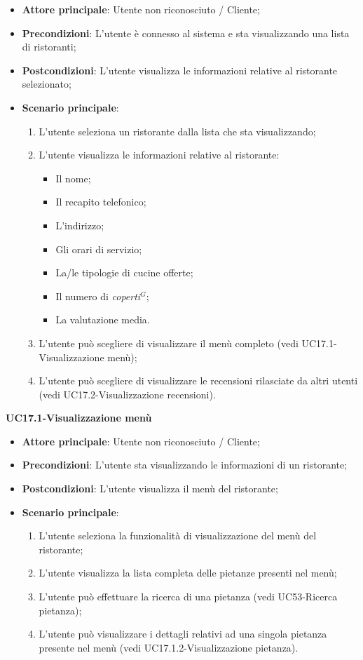 \begin{itemize}
\item \textbf{Attore principale}: Utente non riconosciuto / Cliente;
\item \textbf{Precondizioni}: L'utente è connesso al sistema e sta visualizzando una lista di ristoranti;
\item \textbf{Postcondizioni}: L'utente visualizza le informazioni relative al ristorante selezionato;
\item \textbf{Scenario principale}:
\begin{enumerate}
\item L'utente seleziona un ristorante dalla lista che sta visualizzando;
\item L'utente visualizza le informazioni relative al ristorante:
\begin{itemize}
\item Il nome;
\item Il recapito telefonico;
\item L'indirizzo;
\item Gli orari di servizio;
\item La/le tipologie di cucine offerte;
\item Il numero di \emph{coperti}$^{G}$;
\item La valutazione media.
\end{itemize}
\item L'utente può scegliere di visualizzare il menù completo (vedi UC17.1-Visualizzazione menù);
\item L'utente può scegliere di visualizzare le recensioni rilasciate da altri utenti (vedi UC17.2-Visualizzazione recensioni).
\end{enumerate}
\end{itemize}

\pagebreak
\textbf{UC17.1-Visualizzazione menù}

\begin{itemize}
\item \textbf{Attore principale}: Utente non riconosciuto / Cliente;
\item \textbf{Precondizioni}: L'utente sta visualizzando le informazioni di un ristorante;
\item \textbf{Postcondizioni}: L'utente visualizza il menù del ristorante;
\item \textbf{Scenario principale}:
\begin{enumerate}
\item L'utente seleziona la funzionalità di visualizzazione del menù del ristorante;
\item L'utente visualizza la lista completa delle pietanze presenti nel menù;
\item L'utente può effettuare la ricerca di una pietanza (vedi UC53-Ricerca pietanza);
\item L'utente può visualizzare i dettagli relativi ad una singola pietanza presente nel menù (vedi UC17.1.2-Visualizzazione pietanza).
\end{enumerate}
\end{itemize}

